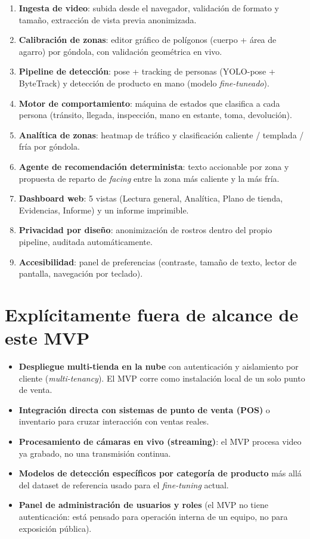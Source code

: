 \documentclass[11pt,a4paper]{report}
\begin{document}
\begin{enumerate}
  \item \textbf{Ingesta de video}: subida desde el navegador, validación de formato y tamaño,
    extracción de vista previa anonimizada.
  \item \textbf{Calibración de zonas}: editor gráfico de polígonos (cuerpo + área de agarro) por
    góndola, con validación geométrica en vivo.
  \item \textbf{Pipeline de detección}: pose + tracking de personas (YOLO-pose + ByteTrack) y
    detección de producto en mano (modelo \textit{fine-tuneado}).
  \item \textbf{Motor de comportamiento}: máquina de estados que clasifica a cada persona
    (tránsito, llegada, inspección, mano en estante, toma, devolución).
  \item \textbf{Analítica de zonas}: heatmap de tráfico y clasificación caliente / templada /
    fría por góndola.
  \item \textbf{Agente de recomendación determinista}: texto accionable por zona y propuesta de
    reparto de \textit{facing} entre la zona más caliente y la más fría.
  \item \textbf{Dashboard web}: 5 vistas (Lectura general, Analítica, Plano de tienda,
    Evidencias, Informe) y un informe imprimible.
  \item \textbf{Privacidad por diseño}: anonimización de rostros dentro del propio pipeline,
    auditada automáticamente.
  \item \textbf{Accesibilidad}: panel de preferencias (contraste, tamaño de texto, lector de
    pantalla, navegación por teclado).
\end{enumerate}

\section{Explícitamente fuera de alcance de este MVP}

\begin{itemize}
  \item \textbf{Despliegue multi-tienda en la nube} con autenticación y aislamiento por cliente
    (\textit{multi-tenancy}). El MVP corre como instalación local de un solo punto de venta.
  \item \textbf{Integración directa con sistemas de punto de venta (POS)} o inventario para
    cruzar interacción con ventas reales.
  \item \textbf{Procesamiento de cámaras en vivo (streaming)}: el MVP procesa video ya grabado,
    no una transmisión continua.
  \item \textbf{Modelos de detección específicos por categoría de producto} más allá del dataset
    de referencia usado para el \textit{fine-tuning} actual.
  \item \textbf{Panel de administración de usuarios y roles} (el MVP no tiene autenticación:
    está pensado para operación interna de un equipo, no para exposición pública).
\end{itemize}
\end{document}
